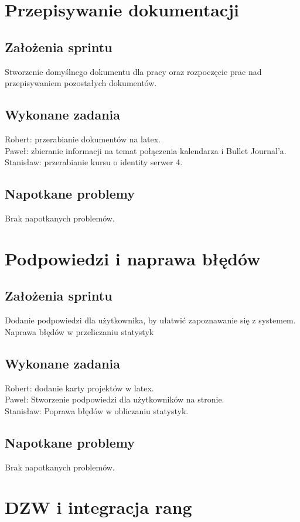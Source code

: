 \documentclass[a4paper,11pt]{report}
\begin{document}
\section {Przepisywanie dokumentacji}
\subsection {Założenia sprintu}
Stworzenie domyślnego dokumentu dla pracy oraz rozpoczęcie prac nad przepisywaniem pozostałych dokumentów.
\subsection {Wykonane zadania}
Robert: przerabianie dokumentów na latex.\\
Paweł: zbieranie informacji na temat połączenia kalendarza i Bullet Journal'a.\\
Stanisław: przerabianie kursu o identity serwer 4.\\
\subsection {Napotkane problemy}
Brak napotkanych problemów.


\section {Podpowiedzi i naprawa błędów}
\subsection {Założenia sprintu}
Dodanie podpowiedzi dla użytkownika, by ułatwić zapoznawanie się z systemem. Naprawa błędów w przeliczaniu statystyk
\subsection {Wykonane zadania}
Robert: dodanie karty projektów w latex.\\
Paweł: Stworzenie podpowiedzi dla użytkowników na stronie. \\
Stanisław: Poprawa błędów w obliczaniu statystyk.  \\
\subsection {Napotkane problemy}
Brak napotkanych problemów.

\section {DZW i integracja rang}
\end{document}
